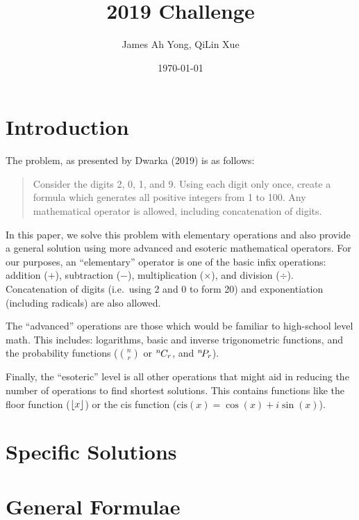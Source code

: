 \documentclass{article}
\title{2019 Challenge}
\author{James Ah Yong, QiLin Xue}
\date\today
\DeclarePairedDelimiter\floor{\lfloor}{\rfloor}
\newcommand*{\permcomb}[4][0mu]{{{}^{#3}\mkern#1#2_{#4}}}
\newcommand*{\perm}[1][-3mu]{\permcomb[#1]{P}}
\newcommand*{\comb}[1][-1mu]{\permcomb[#1]{C}}
\begin{document}
\maketitle

\section{Introduction}

The problem, as presented by Dwarka (2019) is as follows:

\begin{quotation}
  Consider the digits 2, 0, 1, and 9.
  Using each digit only once, create a formula which generates all positive integers from 1 to 100.
  Any mathematical operator is allowed, including concatenation of digits.
\end{quotation}

In this paper, we solve this problem with elementary operations and also provide a general solution using more advanced and esoteric mathematical operators.
For our purposes, an ``elementary'' operator is one of the basic infix operations: addition ($+$), subtraction ($-$), multiplication ($\times$), and division ($\div$). Concatenation of digits (i.e.\ using 2 and 0 to form 20) and exponentiation (including radicals) are also allowed.

The ``advanced'' operations are those which would be familiar to high-school level math. This includes: logarithms, basic and inverse trigonometric functions, and the probability functions ($\binom{n}{r}$ or $\comb{n}{r}$, and $\perm{n}{r}$).

Finally, the ``esoteric'' level is all other operations that might aid in reducing the number of operations to find shortest solutions. This contains functions like the floor function ($\floor{x}$) or the cis function ($\mathrm{cis}(x) = \cos(x) + i \sin(x)$).

\section{Specific Solutions}



\section{General Formulae}


\end{document}
